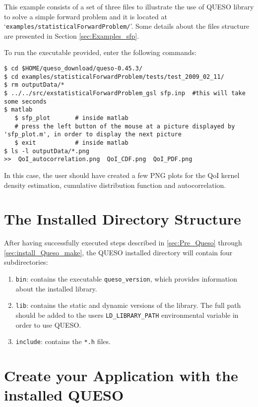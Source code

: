 This example consists of a set of three files to illustrate the use of QUESO library to solve a simple forward problem and it is located at `\texttt{examples/statisticalForwardProblem/}'. Some details about the files structure are presented in Section \ref{sec:Examples_sfp}.

To run the executable provided, enter the following commands:
\begin{lstlisting}[label={},caption={}]
$ cd $HOME/queso_download/queso-0.45.3/
$ cd examples/statisticalForwardProblem/tests/test_2009_02_11/
$ rm outputData/*
$ ../../src/exstatisticalForwardProblem_gsl sfp.inp  #this will take some seconds
$ matlab
   $ sfp_plot       # inside matlab
   # press the left button of the mouse at a picture displayed by 'sfp_plot.m', in order to display the next picture
   $ exit           # inside matlab
$ ls -l outputData/*.png
>>  QoI_autocorrelation.png  QoI_CDF.png  QoI_PDF.png  
\end{lstlisting}


In this case, the user should have created a few PNG plots for the QoI kernel density estimation, cumulative distribution function and autocorrelation.


\section{The Installed Directory Structure} \label{sc-installed-dir-structure}

After having successfully executed steps described in \textsection{}\ref{sec:Pre_Queso} through \textsection{}\ref{sec:install_Queso_make}, the QUESO installed directory will contain four subdirectories:
\begin{enumerate}
 \item \verb+bin+: contains the executable \verb+queso_version+, which provides information about the installed library.
 \item \verb+lib+: contains the static and dynamic versions of the library. The full path should be added to the users \verb+LD_LIBRARY_PATH+ environmental variable in order to use QUESO.
 \item \verb+include+: contains the \verb+*.h+ files.
\end{enumerate}


\section{Create your Application with the installed QUESO} \label{sc-use-queso}


